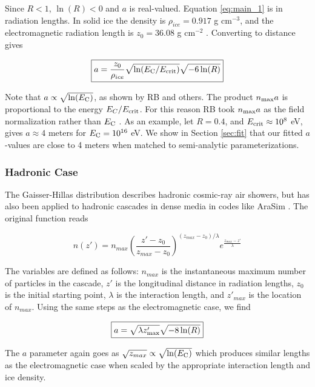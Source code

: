 \documentclass[amsmath,amssymb,aps,prd,10pt,twocolumn]{revtex4}
\begin{document}
Since $R<1$, $\ln(R)<0$ and $a$ is real-valued.  Equation \ref{eq:main_1} is in radiation lengths.  In solid ice the density is $\rho_{ice} = 0.917$ g cm$^{-3}$, and the electromagnetic radiation length is $z_0 = 36.08$ g cm$^{-2}$ \cite{10.1016/j.astropartphys.2017.03.008}.  Converting to distance gives 

\begin{equation}
\boxed{
a = \frac{z_0}{\rho_{ice}}\sqrt{\ln(E_{\rm C}/E_{\rm crit})} \sqrt{-6\ln(R)}
}
\end{equation}

Note that $a \propto \sqrt{\ln(E_{\rm C})}$, as shown by RB and others.  The product $n_{\rm max} a$ is proportional to the energy $E_C/E_{\rm crit}$.  For this reason RB took $n_{\rm max} a$ as the field normalization rather than $E_{\rm C}$ \cite{10.1103/physrevd.65.016003}.  As an example, let $R = 0.4$, and $E_{\rm crit} \approx 10^8$ eV, gives $a \approx 4$ meters for $E_{\rm C} = 10^{16}$ eV.  We show in Section \ref{sec:fit} that our fitted $a$-values are close to 4 meters when matched to semi-analytic parameterizations.

\subsubsection{Hadronic Case}

The Gaisser-Hillas distribution describes hadronic cosmic-ray air showers, but has also been applied to hadronic cascades in dense media in codes like AraSim \cite{testbed,10.1016/j.astropartphys.2011.11.010}.  The original function reads

\begin{equation}
n(z') = n_{max} \left( \frac{z'-z_{0}}{z_{max} - z_{0}} \right)^{(z_{max} - z_{0})/\lambda} e^{ \frac{z_{max} - z'}{\lambda}}
\end{equation}

The variables are defined as follows: $n_{max}$ is the instantaneous maximum number of particles in the cascade, $z'$ is the longitudinal distance in radiation lengths, $z_0$ is the initial starting point, $\lambda$ is the interaction length, and $z'_{max}$ is the location of $n_{max}$.  Using the same steps as the electromagnetic case, we find

\begin{equation}
\boxed{
a = \sqrt{\lambda z'_{\rm max}} \sqrt{-8 \ln(R)}
} \label{eq:main_2}
\end{equation}

The $a$ parameter again goes as $\sqrt{z_{max}} \propto \sqrt{\ln(E_{\rm C})}$ which produces similar lengths as the electromagnetic case when scaled by the appropriate interaction length and ice density.
\end{document}
